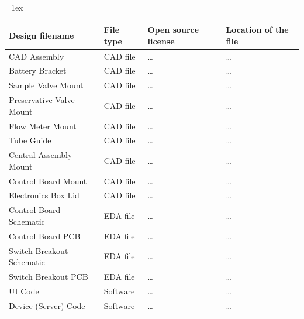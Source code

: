 \documentclass[11pt, letterpaper]{article}
\begin{document}



%
%


\vskip 0.1cm
\tabulinesep=1ex
\begin{tabu} to \linewidth {|X[l]|X[l]|X[1.5,1,l]|X[1.5,1,l]|} 
	\hline
	\textbf{Design filename} & \textbf{File type} & \textbf{Open source license} & \textbf{Location of the file} \\\hline
	
	CAD Assembly 				& CAD file & \dots & \dots \\\hline
	Battery Bracket 			& CAD file & \dots & \dots \\\hline
	Sample Valve Mount 			& CAD file & \dots & \dots \\\hline
	Preservative Valve Mount 	& CAD file & \dots & \dots \\\hline
	Flow Meter Mount 			& CAD file & \dots & \dots \\\hline
	Tube Guide 					& CAD file & \dots & \dots \\\hline
	Central Assembly Mount		& CAD file & \dots & \dots \\\hline
	Control Board Mount 		& CAD file & \dots & \dots \\\hline
	Electronics Box Lid			& CAD file & \dots & \dots \\\hline %
	Control Board Schematic		& EDA file & \dots & \dots \\\hline
	Control Board PCB			& EDA file & \dots & \dots \\\hline
	Switch Breakout Schematic	& EDA file & \dots & \dots \\\hline
	Switch Breakout PCB			& EDA file & \dots & \dots \\\hline
	UI Code 					& Software & \dots & \dots \\\hline
	Device (Server) Code 		& Software & \dots & \dots \\\hline
\end{tabu}
\end{document}
